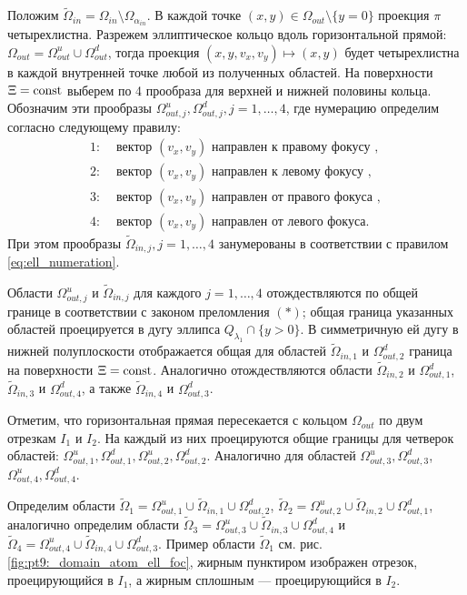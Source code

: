 Положим $\widetilde{\Omega}_{in} = \Omega_{in} \setminus \Omega_{\alpha_{in}}$. 
В каждой точке $(x,y) \in \Omega_{out} \setminus \{y=0\}$ проекция $\pi$ четырехлистна. Разрежем эллиптическое кольцо вдоль горизонтальной прямой: $\Omega_{out} = \Omega_{out}^u \cup \Omega_{out}^d$, тогда проекция $(x, y, v_x, v_y) \mapsto (x,y)$ будет четырехлистна в каждой внутренней точке любой из полученных областей.
На поверхности $\Xi = \mathrm{const}$ выберем по 4 прообраза для верхней и нижней половины кольца. Обозначим эти прообразы $\Omega_{out, j}^u, \Omega_{out, j}^d, j=1, \ldots, 4$, где нумерацию определим согласно следующему правилу:
\begin{equation}
\begin{array}{ll}
1: & \text{ вектор } (v_x, v_y) \text{ направлен к правому фокусу }, \\
2: & \text{ вектор } (v_x, v_y) \text{ направлен к левому фокусу }, \\
3: & \text{ вектор } (v_x, v_y) \text{ направлен от правого фокуса }, \\
4: & \text{ вектор } (v_x, v_y) \text{ направлен от левого фокуса}.
\end{array}
\label{eq:foc_numeration}
\end{equation}
При этом прообразы  $\widetilde{\Omega}_{in, j}, j=1, \ldots, 4$ занумерованы в соответствии с правилом \eqref{eq:ell_numeration}.

Области $\Omega_{out, j}^u$ и $\widetilde{\Omega}_{in, j}$ для каждого $j=1, \ldots, 4$ отождествляются по общей границе в соответствии с законом преломления $(\ast)$; общая граница указанных областей проецируется в дугу эллипса $Q_{\lambda_1} \cap \{y > 0\}$. 
В симметричную ей дугу в нижней полуплоскости отображается общая для областей $\widetilde{\Omega}_{in, 1}$ и $\Omega_{out, 2}^d$ граница на поверхности $\Xi = \mathrm{const}$. Аналогично отождествляются области $\widetilde{\Omega}_{in, 2}$ и $\Omega_{out, 1}^d$, $\widetilde{\Omega}_{in, 3}$ и $\Omega_{out, 4}^d$, а также $\widetilde{\Omega}_{in, 4}$ и $\Omega_{out, 3}^d$.

Отметим, что горизонтальная прямая пересекается с кольцом $\Omega_{out}$ по двум отрезкам $I_1$ и $I_2$. На каждый из них проецируются общие границы для четверок областей: $\Omega_{out, 1}^u, \Omega_{out, 1}^d, \Omega_{out, 2}^u, \Omega_{out, 2}^d$. Аналогично для областей $\Omega_{out, 3}^u, \Omega_{out, 3}^d$, $ \Omega_{out, 4}^u, \Omega_{out, 4}^d$.

Определим области $\widetilde{\Omega}_1 = \Omega_{out, 1}^u \cup \widetilde{\Omega}_{in, 1} \cup \Omega_{out, 2}^d$, $\widetilde{\Omega}_2 = \Omega_{out, 2}^u \cup \widetilde{\Omega}_{in, 2} \cup \Omega_{out, 1}^d$, аналогично определим области $\widetilde{\Omega}_3 = \Omega_{out, 3}^u \cup \widetilde{\Omega}_{in, 3} \cup \Omega_{out, 4}^d$ и $\widetilde{\Omega}_4 = \Omega_{out, 4}^u \cup \widetilde{\Omega}_{in, 4} \cup \Omega_{out, 3}^d$. Пример области $\widetilde{\Omega}_1$ см. рис. \ref{fig:pt9:_domain_atom_ell_foc},  жирным пунктиром  изображен отрезок, проецирующийся в  $I_1$, а жирным сплошным --- проецирующийся в $I_2$.

